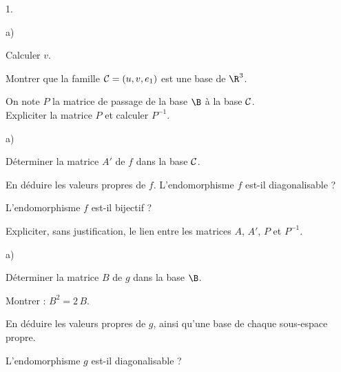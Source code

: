 \begin{noliste}{1.}
  \setlength{\itemsep}{4mm}
  \item 
  \begin{noliste}{a)}
    \setlength{\itemsep}{2mm}
    \item Calculer $v$.
    
    

    
    \item Montrer que la famille ${\cal C}=(u,v,e_1)$ est une base de 
    $\R^3$.
    
    

    
    \item On note $P$ la matrice de passage de la base $\B$ à la base 
    ${\cal C}$.\\
    Expliciter la matrice $P$ et calculer $P^{-1}$.
    
    
  \end{noliste}
  
  \item 
  \begin{noliste}{a)}
    \setlength{\itemsep}{2mm}
    \item Déterminer la matrice $A'$ de $f$ dans la base ${\cal C}$.
    
    

    
    \item En déduire les valeurs propres de $f$. L'endomorphisme $f$
    est-il diagonalisable ?
    
    

    
    \item L'endomorphisme $f$ est-il bijectif ?
    
    

    
    \item Expliciter, sans justification, le lien entre les matrices 
    $A$, $A'$, $P$ et $P^{-1}$.
    
    
  \end{noliste}
  
  \item 
  \begin{noliste}{a)}
    \setlength{\itemsep}{2mm}
    \item Déterminer la matrice $B$ de $g$ dans la base $\B$.
    
    

    
    \item Montrer : $B^2=2 \, B$.
    
    
    
    
    
    

    
    \item En déduire les valeurs propres de $g$, ainsi qu'une base de 
    chaque sous-espace propre.
    
    

    
    \item L'endomorphisme $g$ est-il diagonalisable ?
    
    
  \end{noliste}
\end{noliste}

